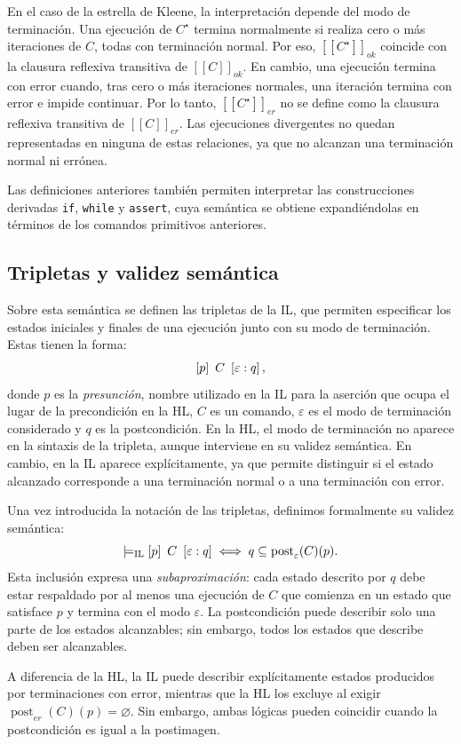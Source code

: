 \documentclass[a4paper,	11pt]{report}
\begin{document}
En el caso de la estrella de Kleene,
la interpretación depende del modo de terminación.
Una ejecución de $C^\star$ termina normalmente si realiza cero o más iteraciones de $C$,
todas con terminación normal.
Por eso,
$[\![C^\star]\!]_{ok}$ coincide con la clausura reflexiva transitiva de $[\![C]\!]_{ok}$.
En cambio,
una ejecución termina con error cuando,
tras cero o más iteraciones normales,
una iteración termina con error e impide continuar.
Por lo tanto,
$[\![C^\star]\!]_{er}$ no se define como la clausura reflexiva transitiva de $[\![C]\!]_{er}$.
Las ejecuciones divergentes no quedan representadas en ninguna de estas relaciones,
ya que no alcanzan una terminación normal ni errónea.

Las definiciones anteriores también permiten interpretar las construcciones derivadas
\texttt{if}, \texttt{while} y \texttt{assert},
cuya semántica se obtiene expandiéndolas en términos de los comandos primitivos anteriores.

\subsection*{Tripletas y validez semántica}
Sobre esta semántica se definen las tripletas de la IL,
que permiten especificar los estados iniciales y finales de una ejecución junto con su modo de terminación.
Estas tienen la forma:
$$\left\lbrack p \right\rbrack~C~\left\lbrack \varepsilon : q \right\rbrack,$$
donde $p$ es la \emph{presunción},
nombre utilizado en la IL para la aserción que ocupa el lugar de la precondición en la HL,
$C$ es un comando,
$\varepsilon$ es el modo de terminación considerado y $q$ es la postcondición.
En la HL, el modo de terminación no aparece en la sintaxis de la tripleta,
aunque interviene en su validez semántica.
En cambio, en la IL aparece explícitamente,
ya que permite distinguir si el estado alcanzado corresponde a una terminación normal o a una terminación con error.

Una vez introducida la notación de las tripletas,
definimos formalmente su validez semántica:
$$\models_{\mathrm{IL}} \left\lbrack p \right\rbrack~C~\left\lbrack \varepsilon : q \right\rbrack \iff q \subseteq \operatorname{post}_\varepsilon(C)(p).$$
Esta inclusión expresa una \emph{subaproximación}:
cada estado descrito por $q$ debe estar respaldado por al menos una ejecución de $C$
que comienza en un estado que satisface $p$ y termina con el modo $\varepsilon$.
La postcondición puede describir solo una parte de los estados alcanzables;
sin embargo, todos los estados que describe deben ser alcanzables.

A diferencia de la HL,
la IL puede describir explícitamente estados producidos por terminaciones con error,
mientras que la HL los excluye al exigir $\operatorname{post}_{er}(C)(p) = \varnothing$.
Sin embargo,
ambas lógicas pueden coincidir cuando la postcondición es igual a la postimagen.
\end{document}
